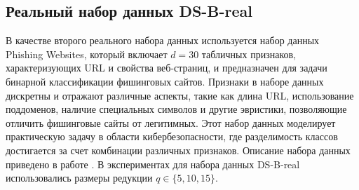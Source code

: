 \documentclass[12pt,a4paper]{article}
\begin{document}
\subsection{Реальный набор данных DS-B-real}

В качестве второго реального набора данных используется набор данных 
Phishing Websites, который включает $d=30$ табличных признаков, 
характеризующих URL и свойства веб-страниц, и предназначен для задачи 
бинарной классификации фишинговых сайтов. Признаки в наборе данных дискретны и 
отражают различные аспекты, такие как длина URL, использование поддоменов, 
наличие специальных символов и другие эвристики, позволяющие отличить 
фишинговые сайты от легитимных. Этот набор данных моделирует практическую задачу 
в области кибербезопасности, где разделимость классов достигается за счет 
комбинации различных признаков. Описание набора данных приведено в работе 
\cite{uci_phishing_2012}. В экспериментах для набора данных 
DS-B-real использовались размеры редукции $q\in\{5,10,15\}$.

\begin{table}[H]
\caption{Результаты на DS-B-real (HGBT, $q=5$)}
\label{tab:exp:DSBreal:HGBT:q5}
\centering\small
{}
\end{table}
\end{document}
